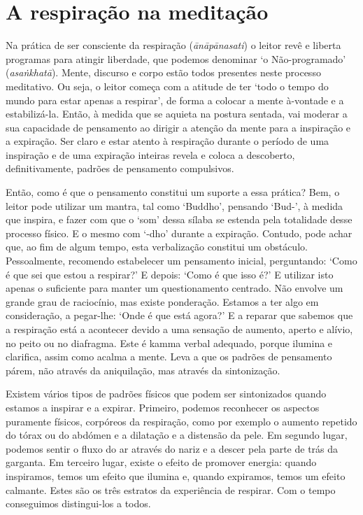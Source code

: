 \section{A respiração na meditação}

Na prática de ser consciente da respiração (\emph{ānāpānasati}) o leitor revê e liberta programas para atingir liberdade, que podemos denominar `o Não-programado' (\emph{asaṅkhatā}). Mente, discurso e corpo estão todos presentes neste processo meditativo. Ou seja, o leitor começa com a atitude de ter `todo o tempo do mundo para estar apenas a respirar', de forma a colocar a mente à-vontade e a estabilizá-la. Então, à medida que se aquieta na postura sentada, vai moderar a sua capacidade de pensamento ao dirigir a atenção da mente para a inspiração e a expiração. Ser claro e estar atento à respiração durante o período de uma inspiração e de uma expiração inteiras revela e coloca a descoberto, definitivamente, padrões de pensamento compulsivos.

Então, como é que o pensamento constitui um suporte a essa prática? Bem, o leitor pode utilizar um mantra, tal como `Buddho', pensando `Bud-', à medida que inspira, e fazer com que o `som' dessa sílaba se estenda pela totalidade desse processo físico. E o mesmo com `-dho' durante a expiração. Contudo, pode achar que, ao fim de algum tempo, esta verbalização constitui um obstáculo. Pessoalmente, recomendo estabelecer um pensamento inicial, perguntando: `Como é que sei que estou a respirar?' E depois: `Como é que isso é?' E utilizar isto apenas o suficiente para manter um questionamento centrado. Não envolve um grande grau de raciocínio, mas existe ponderação. Estamos a ter algo em consideração, a pegar-lhe: `Onde é que está agora?' E a reparar que sabemos que a respiração está a acontecer devido a uma sensação de aumento, aperto e alívio, no peito ou no diafragma. Este é kamma verbal adequado, porque ilumina e clarifica, assim como acalma a mente. Leva a que os padrões de pensamento párem, não através da aniquilação, mas através da sintonização.

Existem vários tipos de padrões físicos que podem ser sintonizados quando estamos a inspirar e a expirar. Primeiro, podemos reconhecer os aspectos puramente físicos, corpóreos da respiração, como por exemplo o aumento repetido do tórax ou do abdómen e a dilatação e a distensão da pele. Em segundo lugar, podemos sentir o fluxo do ar através do nariz e a descer pela parte de trás da garganta. Em terceiro lugar, existe o efeito de promover energia: quando inspiramos, temos um efeito que ilumina e, quando expiramos, temos um efeito calmante. Estes são os três estratos da experiência de respirar. Com o tempo conseguimos distingui-los a todos.

